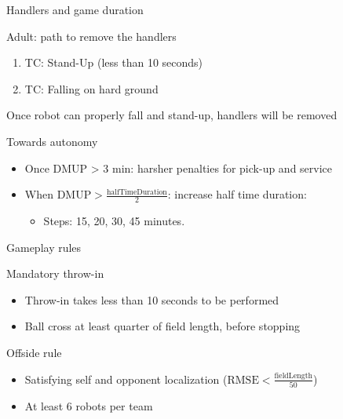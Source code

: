 \documentclass[xcolor=dvipsnames]{beamer}
\begin{document}
\begin{frame}{Handlers and game duration}
  \begin{block}{Adult: path to remove the handlers}
    \begin{enumerate}
    \item TC: Stand-Up (less than 10 seconds)
    \item TC: Falling on hard ground
    \end{enumerate}
    Once robot can properly fall and stand-up, handlers will be removed
  \end{block}

  \begin{block}{Towards autonomy}
    \begin{itemize}
    \item Once DMUP > 3 min: harsher penalties for pick-up and service
    \item When $\text{DMUP} > \frac{\text{halfTimeDuration}}{2}$: increase half
      time duration:
      \begin{itemize}
      \item Steps: 15, 20, 30, 45 minutes.
      \end{itemize}
    \end{itemize}
  \end{block}
\end{frame}

\begin{frame}{Gameplay rules}
  \begin{block}{Mandatory throw-in}
    \begin{itemize}
    \item Throw-in takes less than 10 seconds to be performed
    \item Ball cross at least quarter of field length, before stopping
    \end{itemize}
  \end{block}
  \begin{block}{Offside rule}
    \begin{itemize}
    \item Satisfying self and opponent localization ($\text{RMSE} < \frac{\text{fieldLength}}{50}$)
    \item At least 6 robots per team
    \end{itemize}
  \end{block}
\end{frame}
\end{document}
